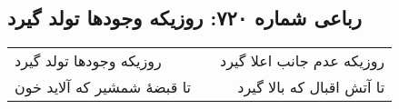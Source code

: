 \begin{center}
\section*{رباعی شماره ۷۲۰: روزیکه وجودها تولد گیرد}
\label{sec:0720}
\begin{longtable}{l p{0.5cm} r}
روزیکه وجودها تولد گیرد
&&
روزیکه عدم جانب اعلا گیرد
\\
تا قبضهٔ شمشیر که آلاید خون
&&
تا آتش اقبال که بالا گیرد
\\
\end{longtable}
\end{center}
